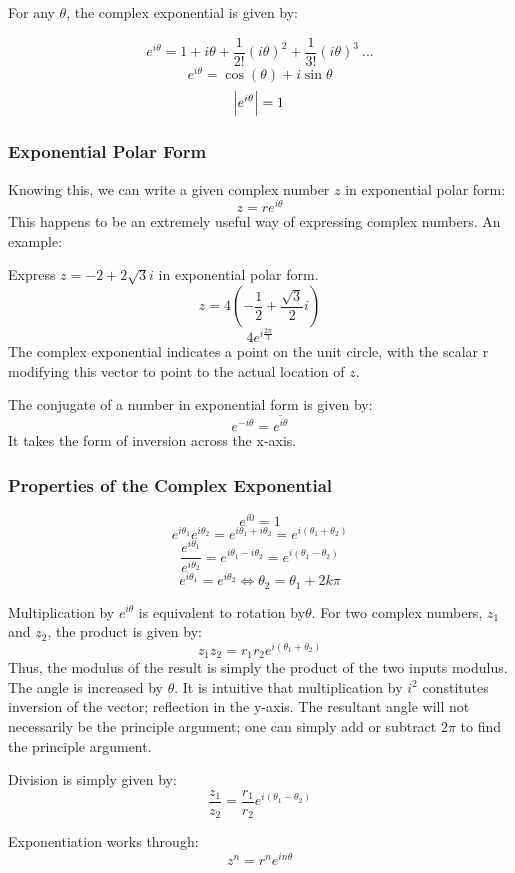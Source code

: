 \documentclass[12pt]{report}
\begin{document}
\begin{flushleft}
For any \(\theta\), the complex exponential is given by:

\[e^{i\theta} = 1 + i\theta + \frac{1}{2!}(i\theta)^2 + 
\frac{1}{3!}(i\theta)^3 \: ...\]
\[e^{i\theta} = \cos(\theta) + i\sin\theta\]
\[\abs{e^{i\theta}} = 1\]

\subsubsection*{Exponential Polar Form}

Knowing this, we can write a given complex number \(z\) in exponential polar 
form:
\[z = re^{i\theta}\]
This happens to be an extremely useful way of expressing complex numbers. An 
example:

\bigskip
Express \(z = -2 + 2\sqrt{3}i\) in exponential polar form.
\[z = 4(-\frac{1}{2} + \frac{\sqrt{3}}{2}i)\]
\[4e^{i\frac{2\pi}{3}}\]
The complex exponential indicates a point on the unit circle, with the scalar r
modifying this vector to point to the actual location of \(z\).

\bigskip
The conjugate of a number in exponential form is given by:
\[e^{-i\theta} = \overline{e^{i\theta}}\]
It takes the form of inversion across the x-axis.

\subsubsection*{Properties of the Complex Exponential}
\[e^{i0} = 1\]
\[e^{i\theta_1}e^{i\theta_2} = e^{i\theta_1+i\theta_2} = 
e^{i(\theta_1+\theta_2)}\]
\[\frac{e^{i\theta_1}}{e^{i\theta_2}} = e^{i\theta_1 - i\theta_2} = 
e^{i(\theta_1-\theta_2)}\]
\[e^{i\theta_1} = e^{i\theta_2} \Leftrightarrow \theta_2 = \theta_1 + 2k\pi\]

Multiplication by \(e^{i\theta}\) is equivalent to rotation by\(\theta\). 
For two complex numbers, \(z_1\) and \(z_2\), the product is given by:
\[z_1z_2 = r_1r_2e^{i(\theta_1+\theta_2)}\]
Thus, the modulus of the result is simply the product of the two inputs 
modulus. The angle is increased by \(\theta\). It is intuitive that 
multiplication by \(i^2\) constitutes inversion of the vector; reflection in
the y-axis. The resultant angle will not necessarily be the principle argument;
one can simply add or subtract \(2\pi\) to find the principle argument.

\bigskip
Division is simply given by:
\[\frac{z_1}{z_2} = \frac{r_1}{r_2}e^{i(\theta_1-\theta_2)}\]

Exponentiation works through:
\[z^n = r^ne^{in\theta}\]


\end{flushleft}
\end{document}

